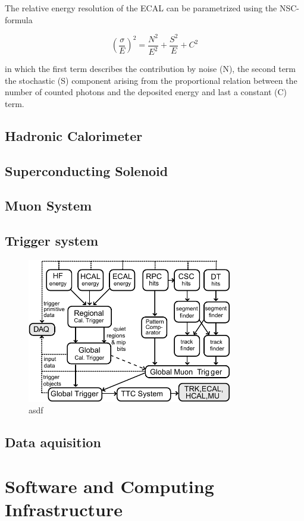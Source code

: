 The relative energy resolution of the ECAL can be parametrized using the NSC-formula

\begin{equation}
    \left( \frac{\sigma}{E} \right)^2 = \frac{N^2}{E^2} + \frac{S^2}{E} + C^2
\end{equation}

in which the first term describes the contribution by noise (N), the second
term the stochastic (S) component arising from the proportional relation between
the number of counted photons and the deposited energy and last a constant (C)
term.

\subsection{Hadronic Calorimeter}
\subsection{Superconducting Solenoid}
\subsection{Muon System}

\subsection{Trigger system}

\begin{figure}[htb]
    \centering
    \includegraphics[width=0.8\textwidth]{figures/cms_detector/cms_l1_trigger.pdf}\hfill
    \caption[The L1 Trigger of CMS.]{asdf}
    \label{fig:cms:l1_trigger}
\end{figure}

\subsection{Data aquisition}

\section{Software and Computing Infrastructure}


